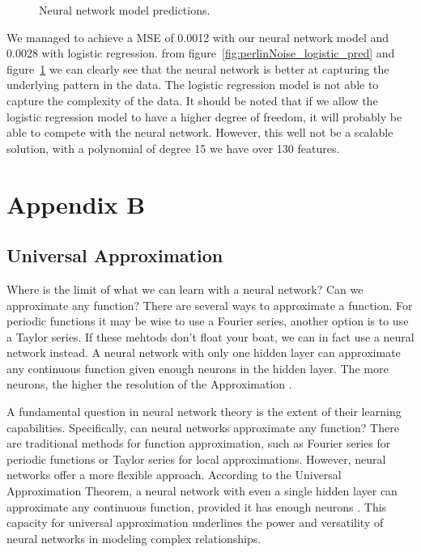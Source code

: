\documentclass[twoside,11pt]{report}
\begin{document}
\begin{figure}[!ht]
\begin{minipage}[t]{0.5\textwidth - 1mm}
\begin{center}
            \end{center}
            \caption
            {
                Neural network model predictions.
            }\label{fig:perlinNoise_NN_pred}
        \end{minipage}
    \end{figure}


    \noindent
    We managed to achieve a MSE of 0.0012 with our neural network model and 0.0028 with logistic regression.
    from figure~\ref{fig:perlinNoise_logistic_pred} and figure~\ref{fig:perlinNoise_NN_pred} we can clearly see that
    the neural network is better at capturing the underlying pattern in the data. The logistic regression model
    is not able to capture the complexity of the data. It should be noted that if we allow the logistic regression
    model to have a higher degree of freedom, it will probably be able to compete with the neural network. However,
    this well not be a scalable solution, with a polynomial of degree 15 we have over 130 features.












\chapter*{Appendix B}
\label{app:appendixB}


\section{Universal Approximation}
\label{sec:UAT}

    Where is the limit of what we can learn with a neural network? Can we approximate any function?
    There are several ways to approximate a function. For periodic functions it may be wise to use a Fourier series,
    another option is to use a Taylor series. If these mehtods don't float your boat, we can in fact use a neural network
    instead. A neural network with only one hidden layer can approximate any continuous function
    given enough neurons in the hidden layer. The more neurons, the higher the resolution of the Approximation
    \cite{HornikEtAl89}. 


A fundamental question in neural network theory is the extent of their learning capabilities. Specifically, 
can neural networks approximate any function? There are traditional methods for function approximation, such 
as Fourier series for periodic functions or Taylor series for local approximations. However, neural networks 
offer a more flexible approach. According to the Universal Approximation Theorem, a neural network with even a 
single hidden layer can approximate any continuous function, provided it has enough neurons \cite{HornikEtAl89}. 
This capacity for universal approximation underlines the power and versatility of neural networks in modeling complex relationships.
\end{document}
